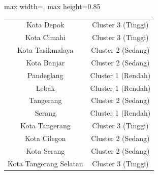 \begin{table}[H]
\begin{adjustbox}{max width=\textwidth, max height=0.85\textheight}
\begin{tabular}{|c|c|}
Kota Depok & Cluster 3 (Tinggi) \\
Kota Cimahi & Cluster 3 (Tinggi) \\
Kota Tasikmalaya & Cluster 2 (Sedang) \\
Kota Banjar & Cluster 2 (Sedang) \\
Pandeglang & Cluster 1 (Rendah) \\
Lebak & Cluster 1 (Rendah) \\
Tangerang & Cluster 2 (Sedang) \\
Serang & Cluster 1 (Rendah) \\
Kota Tangerang & Cluster 3 (Tinggi) \\
Kota Cilegon & Cluster 2 (Sedang) \\
Kota Serang & Cluster 2 (Sedang) \\
Kota Tangerang Selatan & Cluster 3 (Tinggi) \\
\hline
\end{tabular}
\end{adjustbox}
\end{table}